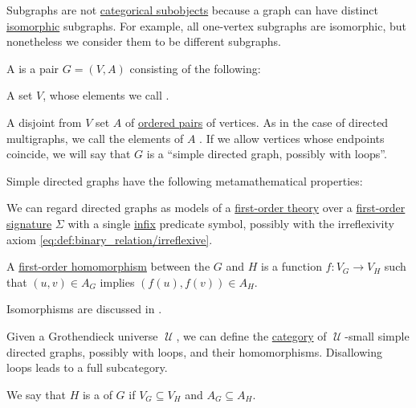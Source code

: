 \begin{remark}\label{rem:subgraphs_and_subobjects}
  Subgraphs are not \hyperref[def:subobject_and_quotient]{categorical subobjects} because a graph can have distinct \hyperref[thm:graph_isomorphisms]{isomorphic} subgraphs. For example, all one-vertex subgraphs are isomorphic, but nonetheless we consider them to be different subgraphs.
\end{remark}

\begin{definition}\label{def:directed_graph}
  A  is a pair \( G = (V, A) \) consisting of the following:
  \begin{thmenum}[series=def:directed_graph]
     A set \( V \), whose elements we call .

     A disjoint from \( V \) set \( A \) of \hyperref[def:cartesian_product/kuratowski_pair]{ordered pairs} of  vertices. As in the case of directed multigraphs, we call the elements of \( A \) . If we allow vertices whose endpoints coincide, we will say that \( G \) is a \enquote{simple directed graph, possibly with loops}.
  \end{thmenum}

  Simple directed graphs have the following metamathematical properties:
  \begin{thmenum}[resume=def:directed_graph]
    \mimprovised We can regard directed graphs as models of a \hyperref[def:first_order_theory]{first-order theory} over a \hyperref[def:first_order_signature]{first-order signature} \( \Sigma \) with a single \hyperref[rem:first_order_formula_conventions/infix]{infix} predicate symbol, possibly with the irreflexivity axiom \eqref{eq:def:binary_relation/irreflexive}.

    \mimprovised A \hyperref[def:first_order_homomorphism]{first-order homomorphism} between the \( G \) and \( H \) is a function \( f: V_G \to V_H \) such that \( (u, v) \in A_G \) implies \( (f(u), f(v)) \in A_H \).

    Isomorphisms are discussed in .

    \mimprovised Given a Grothendieck universe \( \mscrU \), we can define the \hyperref[def:category]{category} of \( \mscrU \)-small simple directed graphs, possibly with loops, and their homomorphisms. Disallowing loops leads to a full subcategory.

    \mimprovised We say that \( H \) is a  of \( G \) if \( V_G \subseteq V_H \) and \( A_G \subseteq A_H \).
  \end{thmenum}
\end{definition}
